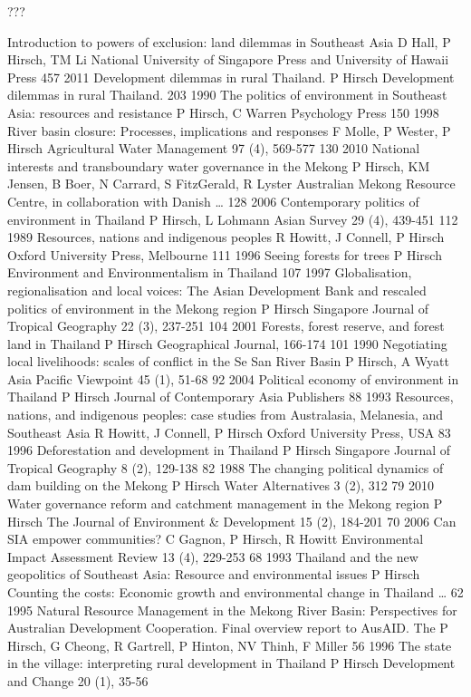 ???

Introduction to powers of exclusion: land dilemmas in Southeast Asia
D Hall, P Hirsch, TM Li
National University of Singapore Press and University of Hawaii Press	457	2011
Development dilemmas in rural Thailand.
P Hirsch
Development dilemmas in rural Thailand.	203	1990
The politics of environment in Southeast Asia: resources and resistance
P Hirsch, C Warren
Psychology Press	150	1998
River basin closure: Processes, implications and responses
F Molle, P Wester, P Hirsch
Agricultural Water Management 97 (4), 569-577	130	2010
National interests and transboundary water governance in the Mekong
P Hirsch, KM Jensen, B Boer, N Carrard, S FitzGerald, R Lyster
Australian Mekong Resource Centre, in collaboration with Danish …	128	2006
Contemporary politics of environment in Thailand
P Hirsch, L Lohmann
Asian Survey 29 (4), 439-451	112	1989
Resources, nations and indigenous peoples
R Howitt, J Connell, P Hirsch
Oxford University Press, Melbourne	111	1996
Seeing forests for trees
P Hirsch
Environment and Environmentalism in Thailand	107	1997
Globalisation, regionalisation and local voices: The Asian Development Bank and rescaled politics of environment in the Mekong region
P Hirsch
Singapore Journal of Tropical Geography 22 (3), 237-251	104	2001
Forests, forest reserve, and forest land in Thailand
P Hirsch
Geographical Journal, 166-174	101	1990
Negotiating local livelihoods: scales of conflict in the Se San River Basin
P Hirsch, A Wyatt
Asia Pacific Viewpoint 45 (1), 51-68	92	2004
Political economy of environment in Thailand
P Hirsch
Journal of Contemporary Asia Publishers	88	1993
Resources, nations, and indigenous peoples: case studies from Australasia, Melanesia, and Southeast Asia
R Howitt, J Connell, P Hirsch
Oxford University Press, USA	83	1996
Deforestation and development in Thailand
P Hirsch
Singapore Journal of Tropical Geography 8 (2), 129-138	82	1988
The changing political dynamics of dam building on the Mekong
P Hirsch
Water Alternatives 3 (2), 312	79	2010
Water governance reform and catchment management in the Mekong region
P Hirsch
The Journal of Environment \& Development 15 (2), 184-201	70	2006
Can SIA empower communities?
C Gagnon, P Hirsch, R Howitt
Environmental Impact Assessment Review 13 (4), 229-253	68	1993
Thailand and the new geopolitics of Southeast Asia: Resource and environmental issues
P Hirsch
Counting the costs: Economic growth and environmental change in Thailand …	62	1995
Natural Resource Management in the Mekong River Basin: Perspectives for Australian Development Cooperation. Final overview report to AusAID. The
P Hirsch, G Cheong, R Gartrell, P Hinton, NV Thinh, F Miller
56	1996
The state in the village: interpreting rural development in Thailand
P Hirsch
Development and Change 20 (1), 35-56
